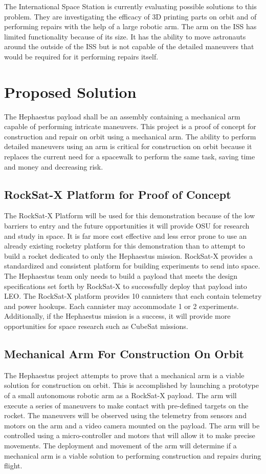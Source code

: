 \documentclass[letterpaper,10pt]{article}
\begin{document}
The International Space Station is currently evaluating possible solutions to this problem. They are 
investigating the efficacy of 3D printing parts on orbit and of performing repairs with the help of 
a large robotic arm. The arm on the ISS has limited functionality because of its size.
 It has the ability to move astronauts around the outside of the ISS but is not capable of the detailed
maneuvers that would be required for it performing repairs itself.


\section{Proposed Solution}
The Hephaestus payload shall be an assembly containing a mechanical arm capable of performing
intricate maneuvers.
This project is a proof of concept for construction and repair on orbit using a mechanical arm. 
The ability to perform detailed maneuvers using an arm is critical for construction on orbit because
it replaces the current need for a spacewalk to perform the same task, saving time and money and
decreasing risk.

\subsection{RockSat-X Platform for Proof of Concept}
The RockSat-X Platform will be used for this demonstration because of the low barriers to entry and
the future opportunities it will provide OSU for research and study in space.
It is far more cost effective and less error prone to use an already existing rocketry platform for
this demonstration than to attempt to build a rocket dedicated to only the Hephaestus mission.
RockSat-X provides a standardized and consistent platform for building experiments to send into space.
The Hephaestus team only needs to build a payload that meets the design specifications set forth by
RockSat-X to successfully deploy that payload into LEO.
The RockSat-X platform provides 10 cannisters that each contain telemetry and power hookups.
Each cannister may accommodate 1 or 2 experiments.
Additionally, if the Hephaestus mission is a success, it will provide more opportunities for space
research such as CubeSat missions.
\subsection{Mechanical Arm For Construction On Orbit}
The Hephaestus project attempts to prove that a mechanical arm is a viable solution for construction on orbit.
This is accomplished by launching a prototype of a small autonomous robotic arm as a RockSat-X payload.
The arm will execute a series of maneuvers to make contact with pre-defined targets on the rocket.
The maneuvers will be observed using the telemetry from sensors and motors on the arm and a video
camera mounted on the payload.
The arm will be controlled using a micro-controller and motors that will allow it to make precise movements.
The deployment and movement of the arm will determine if a mechanical arm is a viable solution to
performing construction and repairs during flight.
\end{document}
